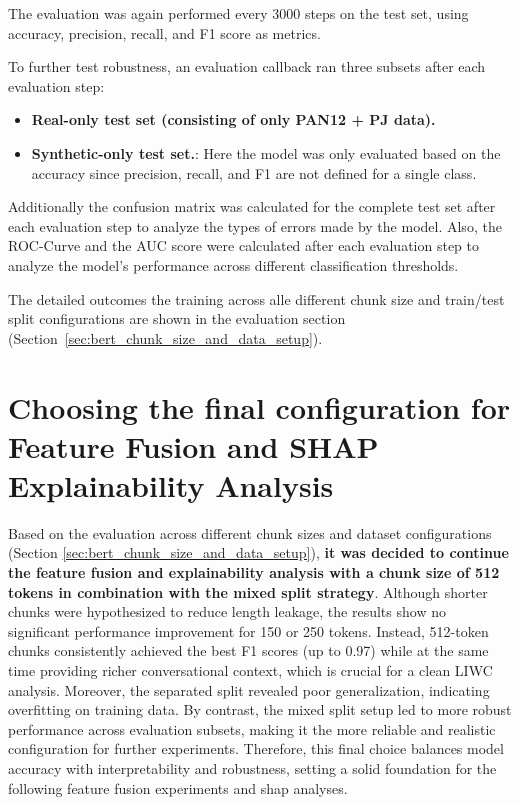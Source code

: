 The evaluation was again performed every 3000 steps on the test set, using accuracy, precision, recall, and F1 score as metrics. 

To further test robustness, an evaluation callback ran three subsets after each evaluation step:
\begin{itemize}
\item \textbf{Real-only test set (consisting of only PAN12 + PJ data).}
\item \textbf{Synthetic-only test set.}: Here the model was only evaluated based on the accuracy since precision, recall, and F1 are not defined for a single class.
\end{itemize}

Additionally the confusion matrix was calculated for the complete test set after each evaluation step to analyze the types of errors made by the model. Also, the ROC-Curve and the AUC score were calculated after each evaluation step to analyze the model's performance across different classification thresholds.

The detailed outcomes the training across alle different chunk size and train/test split configurations are shown in the evaluation section (Section~\ref{sec:bert_chunk_size_and_data_setup}).

\section{Choosing the final configuration for Feature Fusion and SHAP Explainability Analysis} 


Based on the evaluation across different chunk sizes and dataset configurations (Section \ref{sec:bert_chunk_size_and_data_setup}), \textbf{it was decided to continue the feature fusion and explainability analysis with a chunk size of 512 tokens in combination with the mixed split strategy}. Although shorter chunks were hypothesized to reduce length leakage, the results show no significant performance improvement for 150 or 250 tokens. Instead, 512-token chunks consistently achieved the best F1 scores (up to 0.97) while at the same time providing richer conversational context, which is crucial for a clean LIWC analysis. Moreover, the separated split revealed poor generalization, indicating overfitting on training data. By contrast, the mixed split setup led to more robust performance across evaluation subsets, making it the more reliable and realistic configuration for further experiments. Therefore, this final choice balances model accuracy with interpretability and robustness, setting a solid foundation for the following feature fusion experiments and shap analyses.


